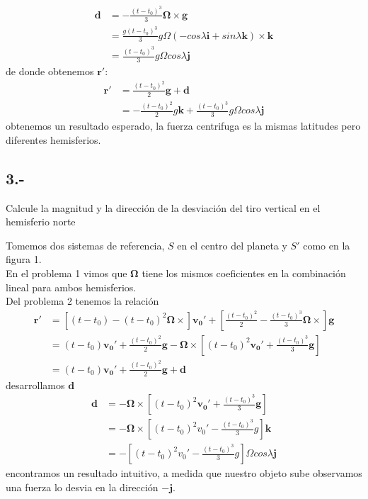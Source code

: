 \documentclass{article}
\begin{document}
\begin{tcolorbox}
    \begin{align*}
        \bm{d} 
        &=-\frac{(t-t_0)^3}{3} \bm{\Omega} \times \bm{g} \\
        &=\frac{g(t-t_0)^3}{3} g\Omega(-cos\lambda\bm{i} + sin\lambda \bm{k}) \times \bm{k} \\
        &=\frac{(t-t_0)^3}{3} g\Omega cos\lambda \bm{j}
    \end{align*}
    de donde obtenemos $\bm{r'}$:
    \begin{align*}
        \bm{r'} 
        &= \frac{(t-t_0)^2}{2} \bm{g} + \bm{d} \\
        &= -\frac{(t-t_0)^2}{2} g\bm{k} + \frac{(t-t_0)^3}{3} g\Omega cos\lambda \bm{j} 
    \end{align*}
    obtenemos un resultado esperado, la fuerza centrifuga es la mismas latitudes pero 
    diferentes hemisferios. \\  
\end{tcolorbox}

\subsection*{3.- }
Calcule la magnitud y la dirección de la desviación del tiro vertical
en el hemisferio norte
\begin{tcolorbox}
    Tomemos dos sistemas de referencia, $S$ en el centro del planeta y $S'$ como en la figura 1. \\ 
    En el problema 1 vimos que $\bm{\Omega}$ tiene los mismos coeficientes en la combinación lineal 
    para ambos hemisferios. \\
    Del problema 2 tenemos la relación
    \begin{align*}
        \bm{r'}
        &=\left[ (t-t_0) - (t-t_0)^2\bm{\Omega} \times \right] \bm{v_0'} 
        + \left[ \frac{(t-t_0)^2}{2} - \frac{(t-t_0)^3}{3} \bm{\Omega} \times \right]\bm{g} \\
        &=(t-t_0)\bm{v_0'} + \frac{(t-t_0)^2}{2}\bm{g}
        - \bm{\Omega} \times \left[ (t-t_0)^2\bm{v_0'} + \frac{(t-t_0)^3}{3}\bm{g} \right] \\
        &=(t-t_0)\bm{v_0'} + \frac{(t-t_0)^2}{2}\bm{g} + \bm{d}
    \end{align*}
    desarrollamos $\bm{d}$
    \begin{align*}
        \bm{d}
        &=-\bm{\Omega} \times \left[ (t-t_0)^2\bm{v_0'} + \frac{(t-t_0)^3}{3}\bm{g} \right] \\
        &=-\bm{\Omega} \times \left[ (t-t_0)^2v_0' - \frac{(t-t_0)^3}{3}g \right] \bm{k} \\ 
        &=-\left[ (t-t_0)^2v_0' - \frac{(t-t_0)^3}{3}g \right]\Omega cos\lambda \bm{j}
    \end{align*}
    encontramos un resultado intuitivo, a medida que nuestro objeto sube observamos una fuerza
    lo desvia en la dirección $\bm{-j}$.   
\end{tcolorbox}
\end{document}
